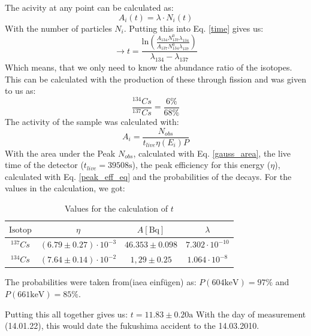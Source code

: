 The acivity at any point can be calculated as:
\begin{equation}
A_i (t) = \lambda \cdot N_i (t)
\end{equation}
With the number of particles $N_i$.
Putting this into Eq. \ref{time} gives us:
\begin{equation}
\rightarrow t = \frac{ \text{ln} \left(\frac{A_{134} N_{137}^0 \lambda_{134}}{A_{137} N_{134}^0 \lambda_{137}}\right)}{\lambda_{134} - \lambda_{137}}
\end{equation}
Which means, that we only need to know the abundance ratio of the isotopes.
This can be calculated with the production of these through fission and was given to us as: 
\[
 \frac{^{134}Cs}{^{137}Cs} = \frac{6 \%}{68\%}
\]
The activity of the sample was calculated with:
\begin{equation}
A_i = \frac{N_{obs}}{t_{live} \eta (E_i) P}
\end{equation}
With the area under the Peak $N_{obs}$, calculated with Eq. \ref{gauss_area}, the live time of the detector ($t_{live}=39508 \text{s}$), the peak efficiency for this energy ($\eta$), calculated with Eq. \ref{peak_eff_eq}  and the probabilities of the decays.
For the values in the calculation, we got:
\begin{table}[h]
\centering
\begin{tabular}{c |c | c |c }
\hline
$\text{Isotop}$ & $ \eta $ & $ A[\text{Bq}] $  & $ \lambda $ \\
\hline
$^{137}Cs$ & $(6.79 \pm 0.27) \cdot 10^{-3}$ & $46.353 \pm 0.098$ & $7.302 \cdot 10^{-10}$ \\
$^{134}Cs$ & $(7.64 \pm 0.14) \cdot 10^{-2}$ & $1,29 \pm 0.25$ & $1.064 \cdot 10^{-8}$ \\
\end{tabular}
\caption{Values for the calculation of $t$}
\end{table}
The probabilities were taken from(iaea einfügen) as: $P(604 \text{keV}) = 97 \%$ and $P(661 \text{keV}) = 85 \%$.

Putting this all together gives us:
$t = 11.83 \pm 0.20 \text{a}$
With the day of measurement (14.01.22), this would date the fukushima accident to the 14.03.2010.


